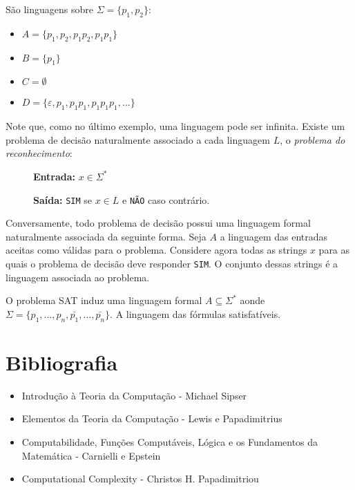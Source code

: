 \begin{example}
São linguagens sobre $\Sigma = \{p_1, p_2\}$:
\begin{itemize}
\item[] $A = \{p_1, p_2, p_1p_2, p_1p_1\}$
\item[] $B = \{p_1\}$
\item[] $C = \emptyset$
\item[] $D = \{\varepsilon, p_1, p_1p_1, p_1p_1p_1, \dots\}$
\end{itemize}
\end{example}

Note que, como no último exemplo, uma linguagem pode ser infinita.
Existe um problema de decisão naturalmente associado a cada linguagem $L$, o {\em problema do reconhecimento}:

\begin{description}
\item[] {\bf Entrada:} $x \in \Sigma^*$
\item[] {\bf Saída:} {\tt SIM} se $x \in L$ e {\tt NÃO} caso contrário.
\end{description}

Conversamente, todo problema de decisão possui uma linguagem formal naturalmente associada da seguinte forma.
Seja $A$ a linguagem das entradas aceitas como válidas para o problema.
Considere agora todas as strings $x$ para as quais o problema de decisão deve responder {\tt SIM}.
O conjunto dessas strings é a linguagem associada ao problema.

\begin{example}
O problema SAT induz uma linguagem formal $A \subseteq \Sigma^*$ aonde $\Sigma = \{p_1, \dots, p_n, \bar{p_1}, \dots, \bar{p_n}\}$.
A linguagem das fórmulas satisfatíveis.
\end{example}

\section{Bibliografia}
\label{sec:biblio}

\begin{itemize}
\item Introdução à Teoria da Computação - Michael Sipser
\item Elementos da Teoria da Computação - Lewis e Papadimitrius
\item Computabilidade, Funções Computáveis, Lógica e os Fundamentos da Matemática - Carnielli e Epstein
\item Computational Complexity - Christos H. Papadimitriou
\end{itemize}

